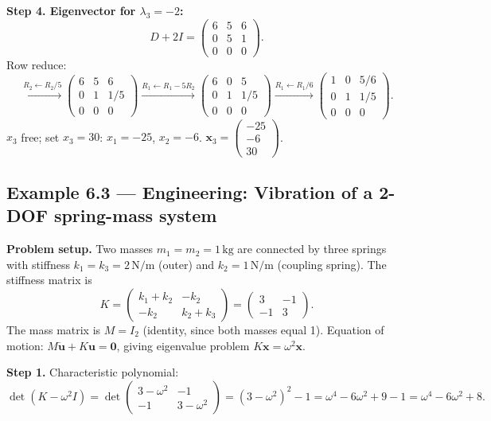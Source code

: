 \documentclass[12pt,a4paper]{article}
\begin{document}
\textbf{Step 4. Eigenvector for $\lambda_3 = -2$:}
\[
  D+2I = \begin{pmatrix}6&5&6\\0&5&1\\0&0&0\end{pmatrix}.
\]
Row reduce:
\[
  \xrightarrow{R_2\leftarrow R_2/5}
  \begin{pmatrix}6&5&6\\0&1&1/5\\0&0&0\end{pmatrix}
  \xrightarrow{R_1\leftarrow R_1-5R_2}
  \begin{pmatrix}6&0&5\\0&1&1/5\\0&0&0\end{pmatrix}
  \xrightarrow{R_1\leftarrow R_1/6}
  \begin{pmatrix}1&0&5/6\\0&1&1/5\\0&0&0\end{pmatrix}.
\]
$x_3$ free; set $x_3=30$: $x_1=-25$, $x_2=-6$. $\mathbf{x}_3=\begin{pmatrix}-25\\-6\\30\end{pmatrix}$.

\subsection*{Example 6.3 --- Engineering: Vibration of a 2-DOF spring-mass system}

\textbf{Problem setup.} Two masses $m_1 = m_2 = 1\,\text{kg}$ are connected by three springs with
stiffness $k_1 = k_3 = 2\,\text{N/m}$ (outer) and $k_2 = 1\,\text{N/m}$ (coupling spring).
The stiffness matrix is
\[
  K = \begin{pmatrix} k_1+k_2 & -k_2 \\ -k_2 & k_2+k_3 \end{pmatrix}
    = \begin{pmatrix} 3 & -1 \\ -1 & 3 \end{pmatrix}.
\]
The mass matrix is $M = I_2$ (identity, since both masses equal 1).
Equation of motion: $M\ddot{\mathbf{u}} + K\mathbf{u} = \mathbf{0}$, giving eigenvalue problem $K\mathbf{x}=\omega^2\mathbf{x}$.

\textbf{Step 1.} Characteristic polynomial:
\[
  \det(K - \omega^2 I)
  = \det\begin{pmatrix}3-\omega^2 & -1 \\ -1 & 3-\omega^2\end{pmatrix}
  = (3-\omega^2)^2 - 1
  = \omega^4 - 6\omega^2 + 9 - 1
  = \omega^4 - 6\omega^2 + 8.
\]
\end{document}
